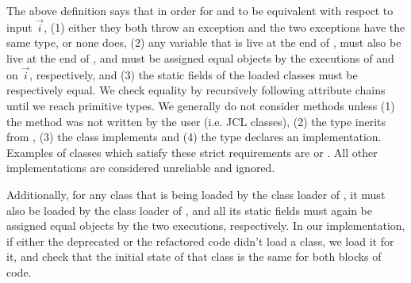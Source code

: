 \documentclass[sigconf,review,anonymous]{acmart}
\begin{document}
The above definition says that in order for  and
 to be equivalent with respect to input $\vec{i}$,
(1) either they both throw an exception and the two exceptions have the same type, or none does,
(2) any variable
that is live at the end of , must also be live at the end of , and  must be
assigned equal objects by the executions of  and
 on $\vec{i}$, respectively, and
(3) the static fields of the loaded classes must be respectively equal.
We check equality by recursively following attribute chains until we reach primitive types. We
generally do not consider  methods unless (1) the method was not written by the user
(i.e. JCL classes), (2) the type inerits from , (3) the class implements
 and (4) the type declares an  implementation. Examples
of classes which satisfy these strict requirements are  or
. All other  implementations are considered unreliable and
ignored.

Additionally, for any class that
is being loaded by the class loader of , it must also be loaded by the class loader of , and
all its static fields must again be assigned equal objects by the
two executions, respectively. 
In our implementation, if either the deprecated or the refactored code didn't load a class, we load it for it,
and check that the initial state of that class is the same for both blocks of code.



\end{document}
